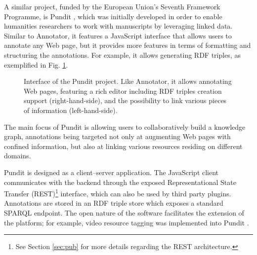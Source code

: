 A similar project, funded by the European Union's Seventh Framework Programme,
is Pundit \cite{ref:pundit}, which was initially developed in order to enable
humanities researchers to work with manuscripts by leveraging linked data.
Similar to Annotator, it features a JavaScript interface that allows users to
annotate any Web page, but it provides more features in terms of formatting and
structuring the annotations. For example, it allows generating RDF triples, as
exemplified in Fig. \ref{fig:pundit}.

\begin{figure}[p]
  \centering
  \caption[Interface of the Pundit project]
          {Interface of the Pundit project. Like Annotator, it allows
           annotating Web pages, featuring a rich editor
           including RDF triples creation support (right-hand-side), and
           the possibility to link various pieces of information
           (left-hand-side).}
  \label{fig:pundit}
\end{figure}

The main focus of Pundit is allowing users to collaboratively build a knowledge
graph, annotations being targeted not only at augmenting Web pages with
confined information, but also at linking various resources residing on
different domains.

Pundit is designed as a client--server application. The JavaScript client
communicates with the backend through the exposed Representational State
Transfer (REST)\footnote{See Section \ref{sec:pub} for more details regarding
the REST architecture.} interface, which can also be used by third party
plugins.  Annotations are stored in an RDF triple store which exposes a standard
SPARQL \cite{ref:sparql} endpoint. The open nature of the software facilitates
the extension of the platform; for example, video resource tagging was
implemented into Pundit \cite{ref:punditvideo}.

